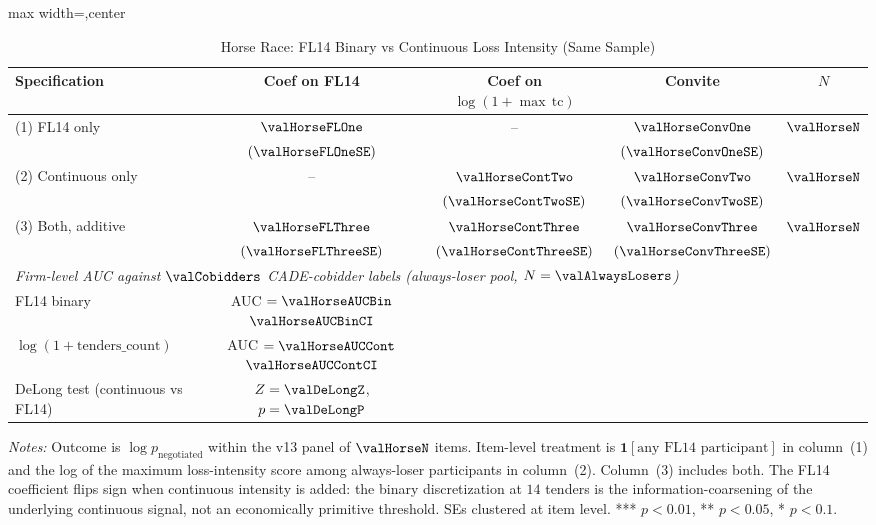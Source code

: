 \begin{table}[htbp]
\centering
\caption{Horse Race: FL14 Binary vs Continuous Loss Intensity (Same Sample)}
\label{tab:horse_race_v14}
\begin{adjustbox}{max width=\textwidth,center}
\begin{threeparttable}
\small
\begin{tabular}{p{4.5cm}cccc}
\toprule
Specification & Coef on FL14 & Coef on $\log(1{+}\max\,\text{tc})$ & Convite & $N$ \\
\midrule
(1) FL14 only                 & $\valHorseFLOne$ & --                & $\valHorseConvOne$ & $\valHorseN$ \\
                              & $(\valHorseFLOneSE)$  &              & $(\valHorseConvOneSE)$ & \\
(2) Continuous only           & --                & $\valHorseContTwo$ & $\valHorseConvTwo$ & $\valHorseN$ \\
                              &                   & $(\valHorseContTwoSE)$ & $(\valHorseConvTwoSE)$ & \\
(3) Both, additive            & $\valHorseFLThree$ & $\valHorseContThree$ & $\valHorseConvThree$ & $\valHorseN$ \\
                              & $(\valHorseFLThreeSE)$ & $(\valHorseContThreeSE)$ & $(\valHorseConvThreeSE)$ & \\
\midrule
\multicolumn{5}{l}{\emph{Firm-level AUC against $\valCobidders$ CADE-cobidder labels (always-loser pool, $N=\valAlwaysLosers$)}} \\
FL14 binary                       & AUC $= \valHorseAUCBin$ $\valHorseAUCBinCI$ & & & \\
$\log(1{+}\text{tenders\_count})$ & AUC $= \valHorseAUCCont$ $\valHorseAUCContCI$ & & & \\
DeLong test (continuous vs FL14)  & $Z = \valDeLongZ$, $p = \valDeLongP$ & & & \\
\bottomrule
\end{tabular}
\begin{tablenotes}
\footnotesize
\item \textit{Notes:} Outcome is $\log p_{\text{negotiated}}$ within the
v13 panel of $\valHorseN$ items. Item-level treatment is
$\mathbf{1}[\text{any FL14 participant}]$ in column~(1) and the log of the
maximum loss-intensity score among always-loser participants in
column~(2). Column~(3) includes both. The FL14 coefficient flips sign
when continuous intensity is added: the binary discretization at $14$
tenders is the information-coarsening of the underlying continuous
signal, not an economically primitive threshold. SEs clustered at item
level. *** $p<0.01$, ** $p<0.05$, * $p<0.1$.
\end{tablenotes}
\end{threeparttable}
\end{adjustbox}
\end{table}
